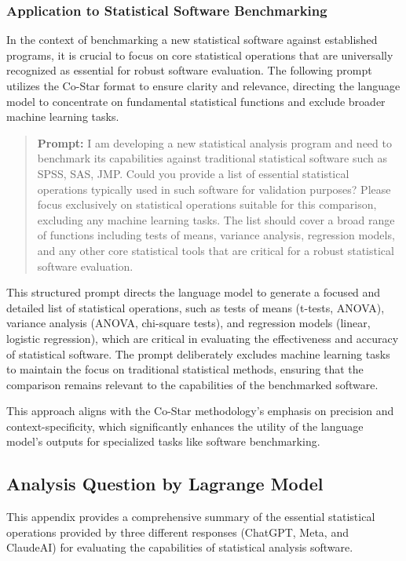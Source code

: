 \documentclass{article}
\begin{document}
\subsubsection{Application to Statistical Software Benchmarking}
In the context of benchmarking a new statistical software against established programs, it is crucial to focus on core statistical operations that are universally recognized as essential for robust software evaluation. The following prompt utilizes the Co-Star format to ensure clarity and relevance, directing the language model to concentrate on fundamental statistical functions and exclude broader machine learning tasks.

\begin{quote}{\textbf{Prompt:}} {I am developing a new statistical analysis program and need to benchmark its capabilities against traditional statistical software such as SPSS, SAS, JMP. Could you provide a list of essential statistical operations typically used in such software for validation purposes? Please focus exclusively on statistical operations suitable for this comparison, excluding any machine learning tasks. The list should cover a broad range of functions including tests of means, variance analysis, regression models, and any other core statistical tools that are critical for a robust statistical software evaluation.} \end{quote}

This structured prompt directs the language model to generate a focused and detailed list of statistical operations, such as tests of means (t-tests, ANOVA), variance analysis (ANOVA, chi-square tests), and regression models (linear, logistic regression), which are critical in evaluating the effectiveness and accuracy of statistical software. The prompt deliberately excludes machine learning tasks to maintain the focus on traditional statistical methods, ensuring that the comparison remains relevant to the capabilities of the benchmarked software.

This approach aligns with the Co-Star methodology's emphasis on precision and context-specificity, which significantly enhances the utility of the language model's outputs for specialized tasks like software benchmarking.


\subsection{Analysis Question by Lagrange Model}

This appendix provides a comprehensive summary of the essential statistical operations provided by three different responses (ChatGPT, Meta, and ClaudeAI) for evaluating the capabilities of statistical analysis software.
\end{document}
